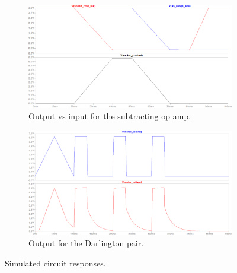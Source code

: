 \begin{figure}[H]
\centering
\begin{subfigure}[]{0.4\textwidth}
\includegraphics[width=\linewidth]{./Figures/Mtr_Ctrl_Sub_Out.png}
\caption{Output vs input for the subtracting op amp.}
\label{subfig:mtrctrl_sub_out}	
\end{subfigure}
\hfill
\begin{subfigure}[]{0.4\textwidth}
\includegraphics[width=\linewidth]{./Figures/Mtr_Ctrl_Darling_Out.png}
\caption{Output for the Darlington pair.} 			
\label{subfig:mtrctrl_darling_out}	
\end{subfigure}
\caption{Simulated circuit responses.}
\label{fig:mtrctrl_out}
\end{figure}


\clearpage
